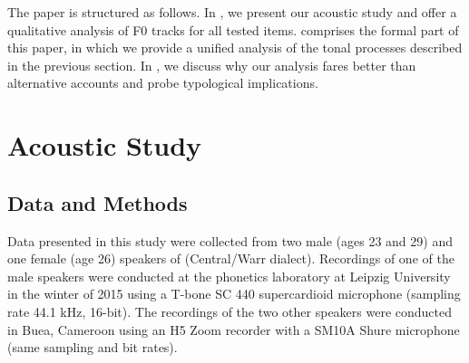 \documentclass[output=paper,newtxmath,modfonts,nonflat,hidelinks]{langsci/langscibook}
\begin{document}
The paper is structured as follows.
In , we present our acoustic study and offer a qualitative analysis of F0 tracks for all tested items.
 comprises the formal part of this paper, in which we provide a unified analysis of the tonal processes described in the previous section.
In , we discuss why our analysis fares better than alternative accounts and probe typological implications.

\section{Acoustic Study}\label{sec:gjersoe:2}

\subsection{Data and Methods}\label{sec:gjersoe:2.1}
Data presented in this study were collected from two male (ages 23 and 29) and one female (age 26) speakers of  (Central/Warr dialect). %
Recordings of one of the male speakers were conducted at the phonetics laboratory at Leipzig University in the winter of 2015 using a T-bone SC 440 supercardioid microphone (sampling rate 44.1 kHz, 16-bit).
The recordings of the two other speakers were conducted in Buea, Cameroon using an H5 Zoom recorder with a SM10A Shure microphone (same sampling and bit rates).
\end{document}
